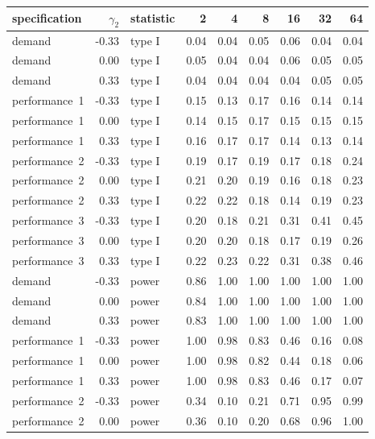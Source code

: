\begin{table}[ht]
\centering
\begingroup\footnotesize
\begin{tabular}{lrlrrrrrr}
  \hline
specification & $\gamma_2$ & statistic & 2 & 4 & 8 & 16 & 32 & 64 \\ 
  \hline
demand & -0.33 & type I & 0.04 & 0.04 & 0.05 & 0.06 & 0.04 & 0.04 \\ 
  demand & 0.00 & type I & 0.05 & 0.04 & 0.04 & 0.06 & 0.05 & 0.05 \\ 
  demand & 0.33 & type I & 0.04 & 0.04 & 0.04 & 0.04 & 0.05 & 0.05 \\ 
  performance~1 & -0.33 & type I & 0.15 & 0.13 & 0.17 & 0.16 & 0.14 & 0.14 \\ 
  performance~1 & 0.00 & type I & 0.14 & 0.15 & 0.17 & 0.15 & 0.15 & 0.15 \\ 
  performance~1 & 0.33 & type I & 0.16 & 0.17 & 0.17 & 0.14 & 0.13 & 0.14 \\ 
  performance~2 & -0.33 & type I & 0.19 & 0.17 & 0.19 & 0.17 & 0.18 & 0.24 \\ 
  performance~2 & 0.00 & type I & 0.21 & 0.20 & 0.19 & 0.16 & 0.18 & 0.23 \\ 
  performance~2 & 0.33 & type I & 0.22 & 0.22 & 0.18 & 0.14 & 0.19 & 0.23 \\ 
  performance~3 & -0.33 & type I & 0.20 & 0.18 & 0.21 & 0.31 & 0.41 & 0.45 \\ 
  performance~3 & 0.00 & type I & 0.20 & 0.20 & 0.18 & 0.17 & 0.19 & 0.26 \\ 
  performance~3 & 0.33 & type I & 0.22 & 0.23 & 0.22 & 0.31 & 0.38 & 0.46 \\ 
  demand & -0.33 & power & 0.86 & 1.00 & 1.00 & 1.00 & 1.00 & 1.00 \\ 
  demand & 0.00 & power & 0.84 & 1.00 & 1.00 & 1.00 & 1.00 & 1.00 \\ 
  demand & 0.33 & power & 0.83 & 1.00 & 1.00 & 1.00 & 1.00 & 1.00 \\ 
  performance~1 & -0.33 & power & 1.00 & 0.98 & 0.83 & 0.46 & 0.16 & 0.08 \\ 
  performance~1 & 0.00 & power & 1.00 & 0.98 & 0.82 & 0.44 & 0.18 & 0.06 \\ 
  performance~1 & 0.33 & power & 1.00 & 0.98 & 0.83 & 0.46 & 0.17 & 0.07 \\ 
  performance~2 & -0.33 & power & 0.34 & 0.10 & 0.21 & 0.71 & 0.95 & 0.99 \\ 
  performance~2 & 0.00 & power & 0.36 & 0.10 & 0.20 & 0.68 & 0.96 & 1.00 \\ 

\end{tabular}
\end{table}
